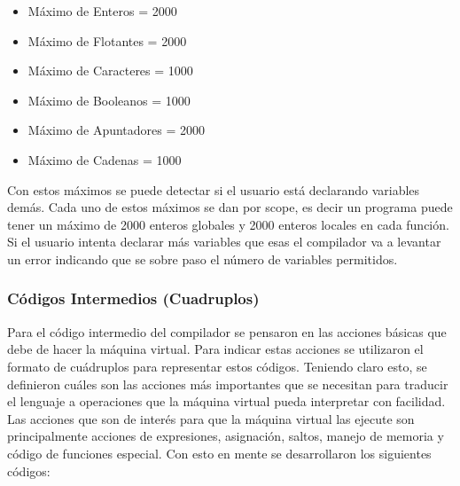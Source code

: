 \begin{itemize}
    \item Máximo de Enteros = 2000
    \item Máximo de Flotantes = 2000
    \item Máximo de Caracteres = 1000
    \item Máximo de Booleanos = 1000
    \item Máximo de Apuntadores = 2000
    \item Máximo de Cadenas = 1000
\end{itemize}

Con estos máximos se puede detectar si el usuario está declarando variables demás. Cada uno de estos máximos se dan por scope, es decir un programa puede tener un máximo de 2000 enteros globales y 2000 enteros locales en cada función. Si el usuario intenta declarar más variables que esas el compilador va a levantar un error indicando que se sobre paso el número de variables permitidos.

\subsubsection{Códigos Intermedios (Cuadruplos)}

Para el código intermedio del compilador se pensaron en las acciones básicas que debe de hacer la máquina virtual. Para indicar estas acciones se utilizaron el formato de cuádruplos para representar estos códigos. Teniendo claro esto, se definieron cuáles son las acciones más importantes que se necesitan para traducir el lenguaje a operaciones que la máquina virtual pueda interpretar con facilidad. Las acciones que son de interés para que la máquina virtual las ejecute son principalmente acciones de expresiones, asignación, saltos, manejo de memoria y código de funciones especial. Con esto en mente se desarrollaron los siguientes códigos:

